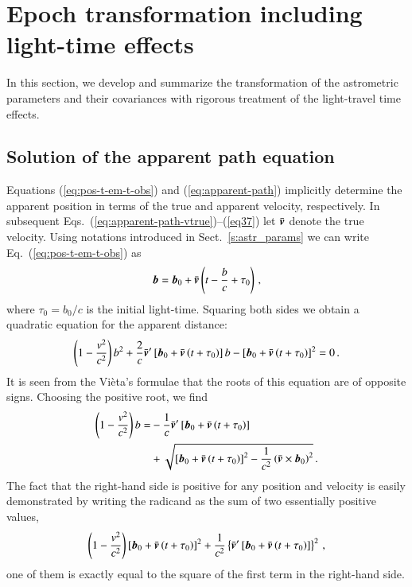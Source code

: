 \documentclass{aa}
\def\vec#1{\ensuremath{\mathchoice{\mbox{\boldmath$\displaystyle#1$}}
{\mbox{\boldmath$\textstyle#1$}}
{\mbox{\boldmath$\scriptstyle#1$}}
{\mbox{\boldmath$\scriptscriptstyle#1$}}}}
\begin{document}
\section{Epoch transformation including light-time
effects}\label{s:including}

In this section, we develop and summarize the transformation of the astrometric parameters and their covariances with rigorous treatment of the light-travel time effects.

\subsection{Solution of the apparent path equation}\label{ss:solution}

Equations (\ref{eq:pos-t-em-t-obs}) and (\ref{eq:apparent-path}) implicitly
determine the apparent position in terms of the true and apparent velocity,
respectively. In subsequent
Eqs.~(\ref{eq:apparent-path-vtrue})--(\ref{eq37})
let $\bar{\vec{v}}$ denote the true velocity.
Using notations introduced in Sect.~\ref{s:astr_params} we can
write Eq.~(\ref{eq:pos-t-em-t-obs}) as
\begin{equation}\label{eq:apparent-path-vtrue}
 \vec{b}=\vec{b}_0+\bar{\vec{v}}\left(t-\frac{b}{c}+\tau_0\right) \, ,
\end{equation}
where $\tau_0=b_0/c$ is the initial light-time. Squaring both sides we
obtain a quadratic equation for the apparent distance:
\begin{equation}\label{eq:quadratic}
 \left(1-\frac{v^2}{c^2}\right)b^2+
 \frac{2}{c}\bar{\vec{v}}'\left[\vec{b}_0+\bar{\vec{v}}\left(t+\tau_0\right)\right]b-
 \left[\vec{b}_0+\bar{\vec{v}}\left(t+\tau_0\right)\right]^2=0 \, .
\end{equation}
It is seen from the Vi{\`e}ta's formulae that the roots of this
equation are of opposite signs. Choosing the positive root, we find
\begin{equation}\label{eq:propagated_distance}
\begin{aligned}
 \left(1-\frac{v^2}{c^2}\right)b=
 &-\frac{1}{c}\bar{\vec{v}}'\left[\vec{b}_0+\bar{\vec{v}}\left(t+\tau_0\right)\right]
\\& +\sqrt{\left[\vec{b}_0+\bar{\vec{v}}\left(t+\tau_0\right)\right]^2-
        \frac{1}{c^2}\left(\bar{\vec{v}}\times\vec{b}_0\right)^2} \, .
\end{aligned}
\end{equation}
The fact that the right-hand side is positive for any position and velocity is easily demonstrated by writing the radicand as the sum of two essentially positive values,
\begin{equation}
    \left(1-\frac{v^2}{c^2}\right)\left[\vec{b}_0+\bar{\vec{v}}\left(t+\tau_0\right)\right]^2+
    \frac{1}{c^2}\left\{\bar{\vec{v}}'\left[\vec{b}_0+\bar{\vec{v}}\left(t+\tau_0\right)\right]\right\}^2\,,
\end{equation}
one of them is exactly equal to the square of the first term in the right-hand side.
\end{document}
